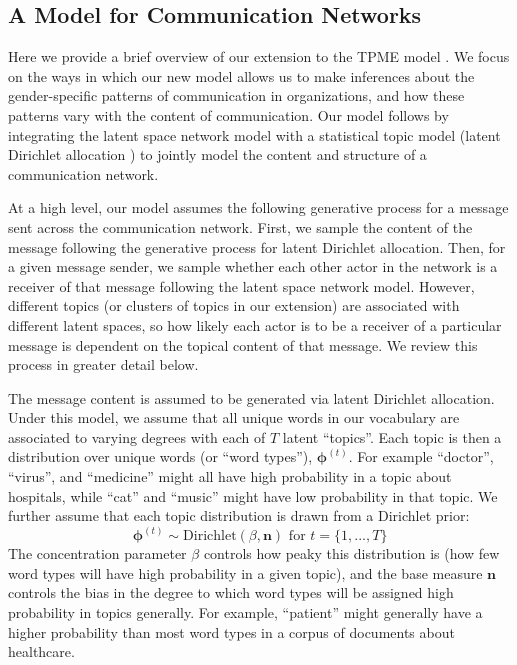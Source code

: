 \documentclass{pnastwo}
\begin{document}
\begin{article}
\section{A Model for Communication Networks}
Here we provide a brief overview of our extension to the TPME model \citep{Krafft2012}. We focus on the ways in which our new model allows us to make inferences about the gender-specific patterns of communication in organizations, and how these patterns vary with the content of communication. Our model follows \citep{Krafft2012} by integrating the latent space network model \citep{Hoff2002a} with a statistical topic model (latent Dirichlet allocation \cite{Blei2003}) to jointly model the content and structure of a communication network. 

At a high level, our model assumes the following generative process for a message sent across the communication network. First, we sample the content of the message following the generative process for latent Dirichlet allocation. Then, for a given message sender, we sample whether each other actor in the network is a receiver of that message following the latent space network model. However, different topics (or clusters of topics in our extension) are associated with different latent spaces, so how likely each actor is to be a receiver of a particular message is dependent on the topical content of that message. We review this process in greater detail below.  

The message content is assumed to be generated via latent Dirichlet allocation. Under this model, we assume that all unique words in our vocabulary are associated to varying degrees with each of $T$ latent ``topics''. Each topic is then a distribution over unique words (or ``word types''), $\boldsymbol{\phi}^{(t)}$. For example ``doctor'', ``virus'', and ``medicine'' might all have high probability in a topic about hospitals, while ``cat'' and ``music'' might have low probability in that topic. We further assume that each topic distribution is drawn from a Dirichlet prior: 
\begin{equation}
	\boldsymbol{\phi}^{(t)} \sim \text{Dirichlet}(\beta,\boldsymbol{n}) \text{ for } t = \{1, ..., T\}
\end{equation}
The concentration parameter $\beta$ controls how peaky this distribution is (how few word types will have high probability in a given topic), and the base measure $\boldsymbol{n}$ controls the bias in the degree to which word types will be assigned high probability in topics generally. For example, ``patient'' might generally have a higher probability than most word types in a corpus of documents about healthcare.   


\end{article}
\end{document}

